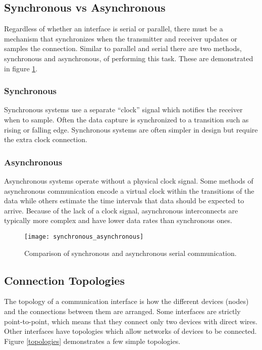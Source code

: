 \documentclass[openany,11pt,fleqn]{book} %
\begin{document}
\subsection{Synchronous vs Asynchronous}

Regardless of whether an interface is serial or parallel, there must be a mechanism that synchronizes when the transmitter and receiver updates or samples the connection. Similar to parallel and serial there are two methods, synchronous and asynchronous, of performing this task. These are demonstrated in figure \ref{synchronous_asynchronous}.

\subsubsection{Synchronous} 
Synchronous systems use a separate ``clock'' signal which notifies the receiver when to sample.  Often the data capture is synchronized to a transition such as rising or falling edge. Synchronous systems are often simpler in design but require the extra clock connection.

\subsubsection{Asynchronous}
Asynchronous systems operate without a physical clock signal. Some methods of asynchronous communication encode a virtual clock within the transitions of the data while others estimate the time intervals that data should be expected to arrive. Because of the lack of a clock signal, asynchronous interconnects are typically more complex and have lower data rates than synchronous ones.  

\begin{figure}[]
    \centering\texttt{[image: synchronous\_asynchronous]}
    \caption{Comparison of synchronous and asynchronous serial communication.}
    \label{synchronous_asynchronous}
\end{figure}

\subsection{Connection Topologies} 
The topology of a communication interface is how the different devices (nodes) and the connections between them are arranged. Some interfaces are strictly point-to-point, which means that they connect only two devices with direct wires. Other interfaces have topologies which allow networks of devices to be connected. Figure \ref{topologies} demonstrates a few simple topologies. 
\end{document}
